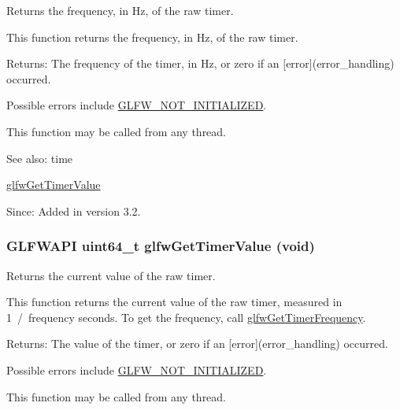 Returns the frequency, in Hz, of the raw timer. 

This function returns the frequency, in Hz, of the raw timer.

\begin{Desc}
\item[Returns:]The frequency of the timer, in Hz, or zero if an \mbox{[}error\mbox{]}(error\_\-handling) occurred.\end{Desc}
Possible errors include \hyperlink{group__errors_g2374ee02c177f12e1fa76ff3ed15e14a}{GLFW\_\-NOT\_\-INITIALIZED}.

This function may be called from any thread.

\begin{Desc}
\item[See also:]time 

\hyperlink{group__input_ga00c3e32227eb70b3968fca0bfe4ae26}{glfwGetTimerValue}\end{Desc}
\begin{Desc}
\item[Since:]Added in version 3.2. \end{Desc}
\hypertarget{group__input_ga00c3e32227eb70b3968fca0bfe4ae26}{
\subsubsection[glfwGetTimerValue]{\setlength{\rightskip}{0pt plus 5cm}GLFWAPI uint64\_\-t glfwGetTimerValue (void)}}
\label{group__input_ga00c3e32227eb70b3968fca0bfe4ae26}


Returns the current value of the raw timer. 

This function returns the current value of the raw timer, measured in 1~/~frequency seconds. To get the frequency, call \hyperlink{group__input_ga92d10b10013372778efbf6367714371}{glfwGetTimerFrequency}.

\begin{Desc}
\item[Returns:]The value of the timer, or zero if an \mbox{[}error\mbox{]}(error\_\-handling) occurred.\end{Desc}
Possible errors include \hyperlink{group__errors_g2374ee02c177f12e1fa76ff3ed15e14a}{GLFW\_\-NOT\_\-INITIALIZED}.

This function may be called from any thread.


